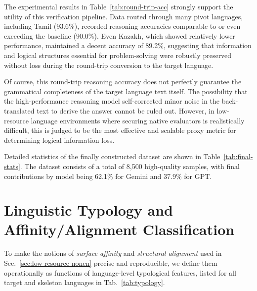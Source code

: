 

The experimental results in Table~\ref{tab:round-trip-acc} strongly support the utility of this verification pipeline. Data routed through many pivot languages, including Tamil (93.6\%), recorded reasoning accuracies comparable to or even exceeding the baseline (90.0\%). Even Kazakh, which showed relatively lower performance, maintained a decent accuracy of 89.2\%, suggesting that information and logical structures essential for problem-solving were robustly preserved without loss during the round-trip conversion to the target language.

Of course, this round-trip reasoning accuracy does not perfectly guarantee the grammatical completeness of the target language text itself. The possibility that the high-performance reasoning model self-corrected minor noise in the back-translated text to derive the answer cannot be ruled out. However, in low-resource language environments where securing native evaluators is realistically difficult, this is judged to be the most effective and scalable proxy metric for determining logical information loss.

Detailed statistics of the finally constructed dataset are shown in Table~\ref{tab:final-stats}. The dataset consists of a total of 8,500 high-quality samples, with final contributions by model being 62.1\% for Gemini and 37.9\% for GPT.



\section{Linguistic Typology and Affinity/Alignment Classification}
\label{app:typology}


To make the notions of \emph{surface affinity} and \emph{structural alignment} used in Sec.~\ref{sec:low-resource-nonen} precise and reproducible, we define them operationally as functions of language-level typological features, listed for all target and skeleton languages in Tab.~\ref{tab:typology}.

